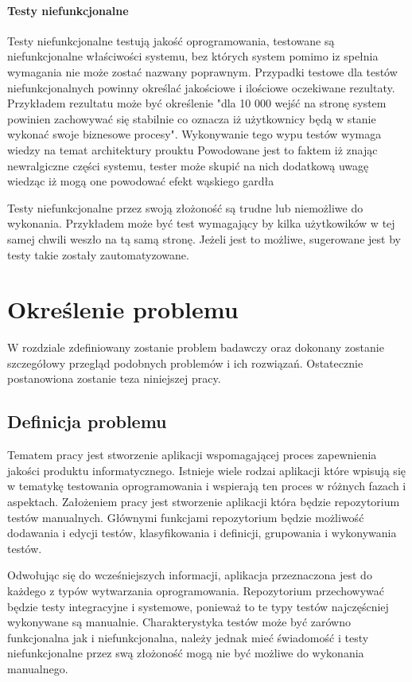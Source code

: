 \subsubsection{Testy niefunkcjonalne}
Testy niefunkcjonalne testują jakość oprogramowania, testowane są  niefunkcjonalne właściwości systemu, bez których system pomimo iz spełnia wymagania nie może zostać nazwany poprawnym. Przypadki testowe dla testów niefunkcjonalnych powinny określać jakościowe i ilościowe oczekiwane rezultaty. Przykładem rezultatu może być określenie "dla 10 000 wejść na stronę system powinien zachowywać się stabilnie co oznacza iż użytkownicy będą w stanie wykonać swoje biznesowe procesy". Wykonywanie tego wypu testów wymaga wiedzy na temat architektury prouktu Powodowane jest to faktem iż znając newralgiczne części systemu, tester może skupić na nich dodatkową uwagę wiedząc iż mogą one powodować efekt wąskiego gardła


Testy niefunkcjonalne przez swoją złożoność są trudne lub niemożliwe do wykonania. Przykładem może być test wymagający by kilka użytkowików w tej samej chwili weszło na tą samą stronę. Jeżeli jest to możliwe, sugerowane jest by testy takie zostały zautomatyzowane.
\chapter{Określenie problemu} %
\label{cha:okreslenie_problemu}

W rozdziale zdefiniowany zostanie problem badawczy oraz dokonany zostanie szczegółowy przegląd  podobnych problemów i ich rozwiązań. Ostatecznie postanowiona zostanie teza niniejszej pracy.

\section{Definicja problemu} %
\label{sec:definicja_problemu}

Tematem pracy jest stworzenie aplikacji wspomagającej proces zapewnienia jakości produktu informatycznego. Istnieje wiele rodzai aplikacji które wpisują się w tematykę testowania oprogramowania i wspierają ten proces w różnych fazach i aspektach. Założeniem pracy jest stworzenie aplikacji która będzie repozytorium testów manualnych. Głównymi funkcjami repozytorium będzie możliwość dodawania i edycji testów, klasyfikowania i definicji, grupowania i wykonywania  testów.


Odwołując się do wcześniejszych informacji, aplikacja przeznaczona jest do każdego z typów wytwarzania oprogramowania. Repozytorium przechowywać będzie testy integracyjne i systemowe, ponieważ to te typy testów najczęścniej wykonywane są manualnie. Charakterystyka testów może być zarówno funkcjonalna jak i niefunkcjonalna, należy jednak mieć świadomość i testy niefunkcjonalne przez swą złożoność mogą nie być możliwe do wykonania manualnego.

